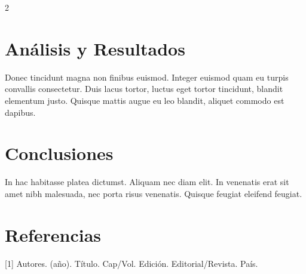 \documentclass{article}
\begin{document}
\begin{multicols}{2}
 \section*{\center Análisis y Resultados}
 Donec tincidunt magna non finibus euismod. Integer euismod quam eu turpis convallis consectetur. Duis lacus tortor, luctus eget tortor tincidunt, blandit elementum justo. Quisque mattis augue eu leo blandit, aliquet commodo est dapibus.
  \vspace{-1.2cm}
 \section*{\center Conclusiones}
 In hac habitasse platea dictumst. Aliquam nec diam elit. In venenatis erat sit amet nibh malesuada, nec porta risus venenatis. Quisque feugiat eleifend feugiat.
 \vspace{-1.2cm}
 \section*{\center Referencias}
 [1] Autores. (año). Título. Cap/Vol.  Edición.  Editorial/Revista. País.
 
\end{multicols}
        
\end{document}
